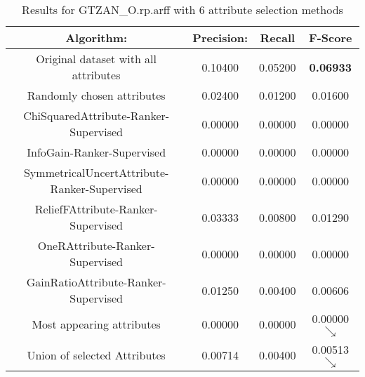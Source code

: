 \begin{table}[p]
\begin{center}
\begin{tabular}{|c|c|c|c|}
\hline Algorithm: & Precision: & Recall & F-Score\\
\hline Original dataset with all attributes  & 0.10400   &  0.05200  &
{\bf 0.06933}\\
\hline Randomly chosen attributes & 0.02400 & 0.01200 & 0.01600\\
\hline ChiSquaredAttribute-Ranker-Supervised & 0.00000 & 0.00000 & 0.00000\\
\hline InfoGain-Ranker-Supervised & 0.00000 & 0.00000 & 0.00000\\
\hline SymmetricalUncertAttribute-Ranker-Supervised & 0.00000 & 0.00000 &
0.00000\\
\hline ReliefFAttribute-Ranker-Supervised & 0.03333 & 0.00800 & 0.01290\\
\hline OneRAttribute-Ranker-Supervised & 0.00000 & 0.00000 & 0.00000\\
\hline GainRatioAttribute-Ranker-Supervised & 0.01250 & 0.00400 & 0.00606
\\
\hline Most appearing attributes & 0.00000 & 0.00000 & 0.00000 $\searrow$\\
\hline Union of selected Attributes & 0.00714 & 0.00400 & 0.00513 $\searrow$\\

\hline
\end{tabular}
\caption{Results for GTZAN\_O.rp.arff with 6 attribute selection methods}
\label{table:classifier:GTZANO6}
\end{center}
\end{table}




